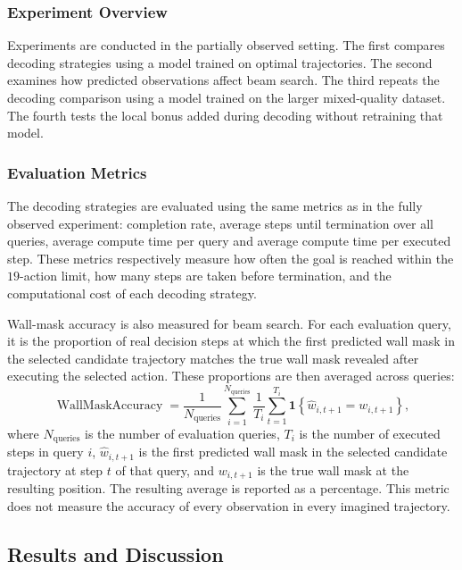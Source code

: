 ﻿\documentclass[12pt,a4paper]{article}
\theoremstyle{definition}
\begin{document}
\subsubsection{Experiment Overview}

Experiments are conducted in the partially observed setting. The first compares decoding
strategies using a model trained on optimal trajectories. The second examines how predicted
observations affect beam search. The third repeats the decoding comparison using a model trained
on the larger mixed-quality dataset. The fourth tests the local bonus added during decoding
without retraining that model.


\subsubsection{Evaluation Metrics}

The decoding strategies are evaluated using the same metrics as in the fully observed
experiment: completion rate, average steps until termination over all queries, average compute
time per query and average compute time per executed step. These metrics respectively measure
how often the goal is reached within the $19$-action limit, how many steps are taken before termination,
and the computational cost of each decoding strategy.

Wall-mask accuracy is also measured for beam search. For each evaluation query, it is the
proportion of real decision steps at which the first predicted wall mask in the selected
candidate trajectory matches the true wall mask revealed after executing the selected action.
These proportions are then averaged across queries:
\begin{equation}
\operatorname{WallMaskAccuracy}
=
\frac{1}{N_{\mathrm{queries}}}
\sum_{i=1}^{N_{\mathrm{queries}}}
\frac{1}{T_i}\sum_{t=1}^{T_i}
\mathbf{1}\left\{\hat{w}_{i,t+1}=w_{i,t+1}\right\},
\end{equation}
where $N_{\mathrm{queries}}$ is the number of evaluation queries, $T_i$ is the number of
executed steps in query $i$, $\hat{w}_{i,t+1}$ is the first predicted wall mask in the
selected candidate trajectory at step $t$ of that query, and $w_{i,t+1}$ is the true
wall mask at the resulting position. The resulting average is reported as a percentage.
This metric does not measure the accuracy of every observation
in every imagined trajectory.

\subsection{Results and Discussion}\
\end{document}
